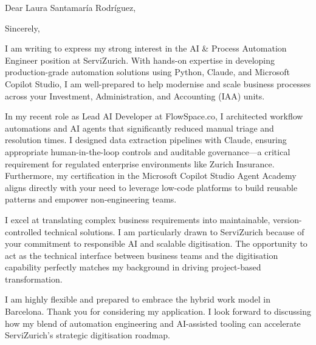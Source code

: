 \documentclass[11pt,a4paper,sans]{moderncv}
\begin{document}
\date{\today}
\opening{Dear Laura Santamaría Rodríguez,}
\closing{Sincerely,}
\makelettertitle

I am writing to express my strong interest in the AI \& Process Automation Engineer position at ServiZurich. With hands-on expertise in developing production-grade automation solutions using Python, Claude, and Microsoft Copilot Studio, I am well-prepared to help modernise and scale business processes across your Investment, Administration, and Accounting (IAA) units.

In my recent role as Lead AI Developer at FlowSpace.co, I architected workflow automations and AI agents that significantly reduced manual triage and resolution times. I designed data extraction pipelines with Claude, ensuring appropriate human-in-the-loop controls and auditable governance—a critical requirement for regulated enterprise environments like Zurich Insurance. Furthermore, my certification in the Microsoft Copilot Studio Agent Academy aligns directly with your need to leverage low-code platforms to build reusable patterns and empower non-engineering teams.

I excel at translating complex business requirements into maintainable, version-controlled technical solutions. I am particularly drawn to ServiZurich because of your commitment to responsible AI and scalable digitisation. The opportunity to act as the technical interface between business teams and the digitisation capability perfectly matches my background in driving project-based transformation.

I am highly flexible and prepared to embrace the hybrid work model in Barcelona. Thank you for considering my application. I look forward to discussing how my blend of automation engineering and AI-assisted tooling can accelerate ServiZurich's strategic digitisation roadmap.

\makeletterclosing
\end{document}
